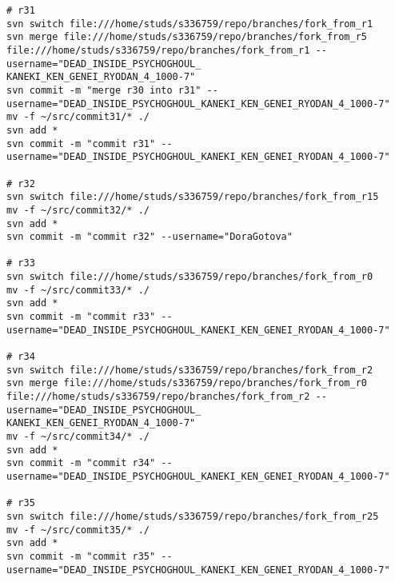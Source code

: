 \begin{verbatim}
# r31
svn switch file:///home/studs/s336759/repo/branches/fork_from_r1
svn merge file:///home/studs/s336759/repo/branches/fork_from_r5 file:///home/studs/s336759/repo/branches/fork_from_r1 --username="DEAD_INSIDE_PSYCHOGHOUL_
KANEKI_KEN_GENEI_RYODAN_4_1000-7"
svn commit -m "merge r30 into r31" --username="DEAD_INSIDE_PSYCHOGHOUL_KANEKI_KEN_GENEI_RYODAN_4_1000-7"
mv -f ~/src/commit31/* ./
svn add *
svn commit -m "commit r31" --username="DEAD_INSIDE_PSYCHOGHOUL_KANEKI_KEN_GENEI_RYODAN_4_1000-7"

# r32
svn switch file:///home/studs/s336759/repo/branches/fork_from_r15
mv -f ~/src/commit32/* ./
svn add *
svn commit -m "commit r32" --username="DoraGotova"

# r33
svn switch file:///home/studs/s336759/repo/branches/fork_from_r0
mv -f ~/src/commit33/* ./
svn add *
svn commit -m "commit r33" --username="DEAD_INSIDE_PSYCHOGHOUL_KANEKI_KEN_GENEI_RYODAN_4_1000-7"

# r34
svn switch file:///home/studs/s336759/repo/branches/fork_from_r2
svn merge file:///home/studs/s336759/repo/branches/fork_from_r0 file:///home/studs/s336759/repo/branches/fork_from_r2 --username="DEAD_INSIDE_PSYCHOGHOUL_
KANEKI_KEN_GENEI_RYODAN_4_1000-7"
mv -f ~/src/commit34/* ./
svn add *
svn commit -m "commit r34" --username="DEAD_INSIDE_PSYCHOGHOUL_KANEKI_KEN_GENEI_RYODAN_4_1000-7"

# r35
svn switch file:///home/studs/s336759/repo/branches/fork_from_r25
mv -f ~/src/commit35/* ./
svn add *
svn commit -m "commit r35" --username="DEAD_INSIDE_PSYCHOGHOUL_KANEKI_KEN_GENEI_RYODAN_4_1000-7"
\end{verbatim}
\normalsize
\newpage

